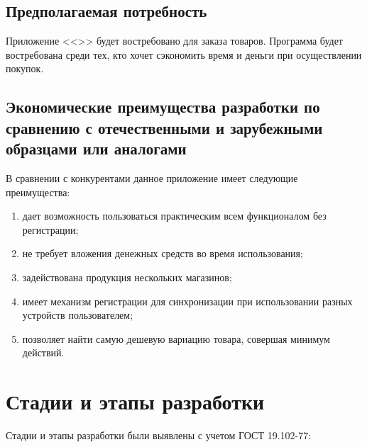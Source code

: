\documentclass[a4paper,12pt,reqno]{article}
\begin{document}
  \subsection{Предполагаемая потребность}
  Приложение <<\CRTname>> будет востребовано для заказа товаров.
  Программа будет востребована среди тех, кто хочет сэкономить время и деньги при осуществлении покупок.

  \subsection{Экономические преимущества разработки по сравнению с отечественными и зарубежными образцами или аналогами}
  В сравнении с конкурентами данное приложение имеет следующие преимущества:

  \begin{enumerate}
    \item дает возможность пользоваться практическим всем функционалом без регистрации;
    \item не требует вложения денежных средств во время использования;
    \item задействована продукция нескольких магазинов;
    \item имеет механизм регистрации для синхронизации при использовании разных устройств пользователем;
    \item позволяет найти самую дешевую вариацию товара, совершая минимум действий.
  \end{enumerate}

  \newpage
  \section{Стадии и этапы разработки}
  Стадии и этапы разработки были выявлены с учетом ГОСТ 19.102-77:
\end{document}
